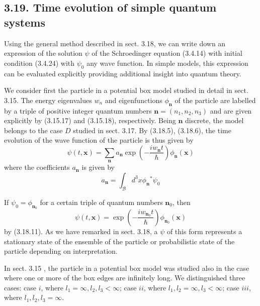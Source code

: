 \documentclass{article}
\begin{document}
\subsection*{3.19. Time evolution of simple quantum systems}

Using the general method described in sect. 3.18, we can write down an expression of the solution $\psi$ of the Schroedinger equation (3.4.14) with initial condition (3.4.24) with $\psi_{0}$ any wave function. In simple models, this expression can be evaluated explicitly providing additional insight into quantum theory.

We consider first the particle in a potential box model studied in detail in sect. 3.15. The energy eigenvalues $w_{n}$ and eigenfunctions $\phi_{\boldsymbol{n}}$ of the particle are labelled by a triple of positive integer quantum numbers $\boldsymbol{n}=\left(n_{1}, n_{2}, n_{3}\right)$ and are given explicitly by (3.15.17) and (3.15.18), respectively. Being $\boldsymbol{n}$ discrete, the model belongs to the case $D$ studied in sect. 3.17. By (3.18.5), (3.18.6), the time evolution of the wave function of the particle is thus given by
$$
\begin{equation*}
\psi(t, \boldsymbol{x})=\sum_{\boldsymbol{n}} a_{\boldsymbol{n}} \exp \left(-\frac{i w_{\boldsymbol{n}} t}{\hbar}\right) \phi_{\boldsymbol{n}}(\boldsymbol{x}) \tag{3.19.1}
\end{equation*}
$$
where the coefficients $a_{\boldsymbol{n}}$ is given by
$$
\begin{equation*}
a_{\boldsymbol{n}}=\int_{\mathcal{B}} d^{3} x \phi_{\boldsymbol{n}}{ }^{*} \psi_{0} \tag{3.19.2}
\end{equation*}
$$

If $\psi_{0}=\phi_{\boldsymbol{n}_{0}}$ for a certain triple of quantum numbers $\boldsymbol{n}_{0}$, then
$$
\begin{equation*}
\psi(t, \boldsymbol{x})=\exp \left(-\frac{i w_{\boldsymbol{n}_{0}} t}{\hbar}\right) \phi_{\boldsymbol{n}_{0}}(\boldsymbol{x}) \tag{3.19.3}
\end{equation*}
$$
by (3.18.11). As we have remarked in sect. 3.18, a $\psi$ of this form represents a stationary state of the ensemble of the particle or probabilistic state of the particle depending on interpretation.

In sect. 3.15 , the particle in a potential box model was studied also in the case where one or more of the box edges are infinitely long. We distinguished three cases: case $i$, where $l_{1}=\infty, l_{2}, l_{3}<\infty$; case $i i$, where $l_{1}, l_{2}=\infty, l_{3}<\infty$; case $i i i$, where $l_{1}, l_{2}, l_{3}=\infty$.
\end{document}
